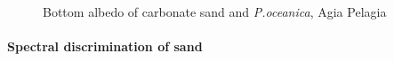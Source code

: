 \documentclass[10pt, a4paper]{article}
\begin{document}
\begin{figure}[h]
	\centering
	\caption{Bottom albedo of carbonate sand and \textit{P.oceanica}, Agia Pelagia}
	\label{fig:4.11}
\end{figure}
\pagebreak

\paragraph{Spectral discrimination of sand}
\end{document}
